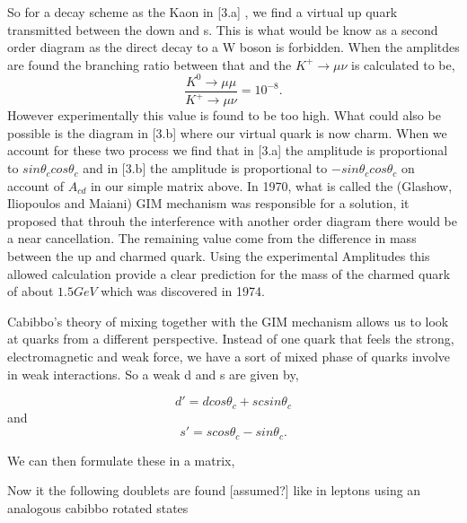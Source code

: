 So for a decay scheme as the Kaon in [3.a] , we find a virtual up quark transmitted between the down and s. This is what would be know as a second order diagram as the direct decay to a W boson is forbidden.
When the amplitdes are found the branching ratio between that and the $K^+\rightarrow\mu\nu$ is calculated to be,
 \[\frac{K^0\rightarrow\mu\mu}{K^+\rightarrow\mu\nu}=10^{-8}.\]
However experimentally this value is found to be too high. What could also be possible is the diagram in [3.b] where our virtual quark is now charm. When we account for these two process we find that in [3.a] the amplitude is proportional to $sin\theta_c cos\theta_c$ and in [3.b] the amplitude is proportional to $-sin\theta_c cos\theta_c$ on account of $A_{cd}$ in our simple matrix above. 
In 1970, what is called the (Glashow, Iliopoulos and Maiani) GIM mechanism was responsible for a solution, it proposed that throuh the interference with another order diagram there would be a near cancellation. The remaining value come from the difference in mass between the up and charmed quark. Using the experimental Amplitudes this allowed calculation provide a clear prediction for the mass of the charmed quark of about $1.5GeV$ which was discovered in 1974.
 
Cabibbo's theory of mixing together with the GIM mechanism allows us to look at quarks from a different perspective. Instead of one quark that feels the strong, electromagnetic and weak force, we have a sort of mixed phase of quarks involve in weak interactions. So a weak d and s are given by,

\[d' =dcos\theta_c +scsin\theta_c\] and
\[s'=scos\theta_c -sin\theta_c.\]

We can then formulate these in a matrix,


Now it the following doublets are found [assumed?] like in leptons using an analogous cabibbo rotated states

